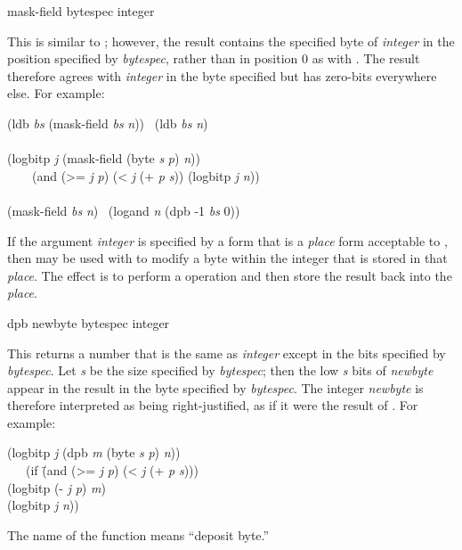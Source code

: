 \begin{defun}[Function]
mask-field bytespec integer

This is similar to ; however, the result contains
the specified byte
of {\it integer} in the position specified by {\it bytespec},
rather than in position 0 as with .
The result therefore agrees with {\it integer} in the byte specified
but has zero-bits everywhere else.
For example:
\begin{lisp}
(ldb {\it bs} (mask-field {\it bs} {\it n})) \EQ\ (ldb {\it bs} {\it n}) \\
 \\
(logbitp {\it j} (mask-field (byte {\it s} {\it p}) {\it n})) \\
~~~\EQ\ (and (>= {\it j} {\it p}) (< {\it j} (+ {\it p} {\it s})) (logbitp {\it j} {\it n})) \\
 \\
(mask-field {\it bs} {\it n}) \EQ\ (logand {\it n} (dpb -1 {\it bs} 0))
\end{lisp}

If the argument {\it integer} is specified by a form that is a {\it place} form
acceptable to ,
then  may be used with 
to modify a byte within the integer that is stored
in that {\it place}.
The effect is to perform a  operation
and then store the result back into the {\it place}.
\end{defun}

\begin{defun}[Function]
dpb newbyte bytespec integer

This returns a number that is the same as {\it integer} except in the
bits specified by {\it bytespec}.  Let {\it s} be the size specified
by {\it bytespec}; then the low {\it s} bits of {\it newbyte} appear in
the result in the byte specified by {\it bytespec}.
The integer {\it newbyte} is therefore interpreted as
being right-justified, as if it were the result of .
For example:
\begin{lisp}
(logbitp {\it j} (dpb {\it m} (byte {\it s} {\it p}) {\it n})) \\
~~\EQ\ (if \=(and (>= {\it j} {\it p}) (< {\it j} (+ {\it p} {\it s}))) \\
\>(logbitp (- {\it j} {\it p}) {\it m}) \\
\>(logbitp {\it j} {\it n}))
\end{lisp}
The name of the function  means ``deposit byte.''
\end{defun}

